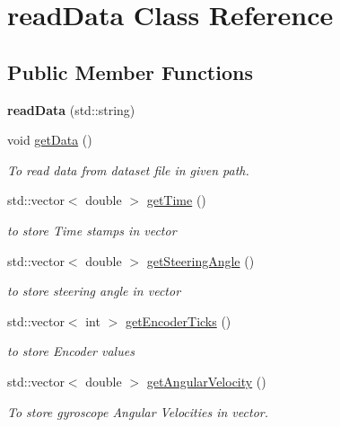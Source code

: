 \hypertarget{classreadData}{}\section{read\+Data Class Reference}
\label{classreadData}
\subsection*{Public Member Functions}
\begin{DoxyCompactItemize}
\item 
{\bfseries read\+Data} (std\+::string)\hypertarget{classreadData_aafc94565142665d60f754f486d9e60b4}{}\label{classreadData_aafc94565142665d60f754f486d9e60b4}

\item 
void \hyperlink{classreadData_a5c39d61d550af529d771100d949f12f4}{get\+Data} ()\hypertarget{classreadData_a5c39d61d550af529d771100d949f12f4}{}\label{classreadData_a5c39d61d550af529d771100d949f12f4}

\begin{DoxyCompactList}\small\item\em To read data from dataset file in given path. \end{DoxyCompactList}\item 
std\+::vector$<$ double $>$ \hyperlink{classreadData_a87f3f0159a94ce954b36d11c4a9fd722}{get\+Time} ()
\begin{DoxyCompactList}\small\item\em to store Time stamps in vector \end{DoxyCompactList}\item 
std\+::vector$<$ double $>$ \hyperlink{classreadData_a0abc79e341be7a1e1ab520f1db3a0123}{get\+Steering\+Angle} ()
\begin{DoxyCompactList}\small\item\em to store steering angle in vector \end{DoxyCompactList}\item 
std\+::vector$<$ int $>$ \hyperlink{classreadData_ac8895f3792121c1520ee092af837e5c2}{get\+Encoder\+Ticks} ()
\begin{DoxyCompactList}\small\item\em to store Encoder values \end{DoxyCompactList}\item 
std\+::vector$<$ double $>$ \hyperlink{classreadData_aa15d0b5939067160941a9c8b44fde54b}{get\+Angular\+Velocity} ()
\begin{DoxyCompactList}\small\item\em To store gyroscope Angular Velocities in vector. \end{DoxyCompactList}\end{DoxyCompactItemize}


